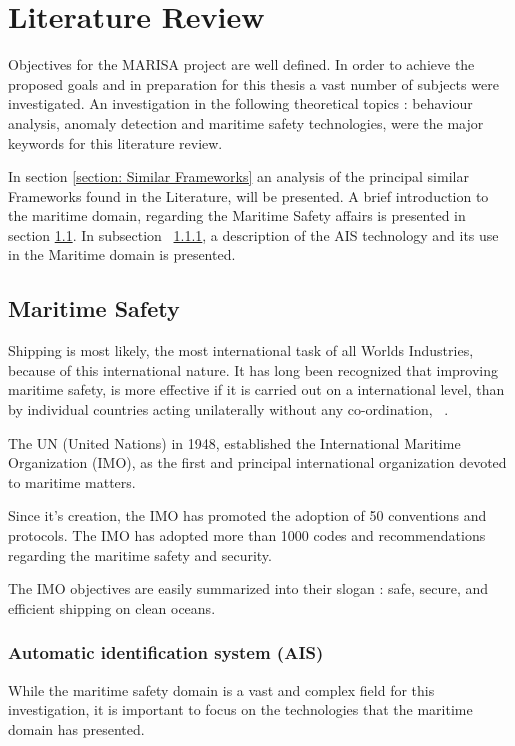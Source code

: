\chapter{Literature Review}
\label{chapter:literatureReview}

Objectives for the MARISA project are well defined. In order to achieve the proposed goals and in preparation for this thesis a vast number of subjects were investigated. An investigation in the following theoretical topics : behaviour analysis, anomaly detection and maritime safety technologies, were the major keywords for this literature review. 

In section \ref{section: Similar Frameworks} an analysis of the principal similar Frameworks found in the Literature, will be presented.
 A brief introduction to the maritime domain, regarding the Maritime Safety affairs is presented in section \ref{section: Maritime Safety}. In subsection ~\ref{subsection: chp2_AIS}, a description of the AIS technology and its use in the Maritime domain is presented.

\section{Maritime Safety}
\label{section: Maritime Safety}

Shipping is most likely, the most international task of all Worlds Industries, because of this international nature. It has long been recognized that improving maritime safety, is more effective if it is  carried out on a international level, than by individual countries acting unilaterally without any co-ordination, ~\cite{IMO2016}.

The UN (United Nations) in 1948, established the International Maritime Organization (IMO), as the first and principal international organization devoted to maritime matters. 

Since it's creation, the IMO has promoted the adoption of 50 conventions and protocols. The IMO has adopted more than 1000 codes and recommendations regarding the maritime safety and security.

The IMO objectives are easily summarized into their slogan : safe, secure, and efficient shipping on clean oceans.

\subsection{Automatic identification system (AIS)}
\label{subsection: chp2_AIS}
While the maritime safety domain is a vast and complex field for this investigation, it is important to focus on the technologies that the maritime domain has presented.

